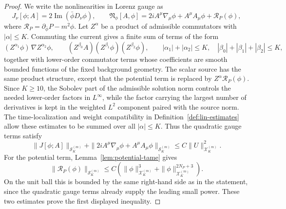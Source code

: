 \documentclass[11pt]{article}
\numberwithin{equation}{section}
\theoremstyle{plain}
\theoremstyle{definition}
\theoremstyle{remark}
\begin{document}
\begin{proof}
We write the nonlinearities in Lorenz gauge as
\begin{equation}
 J_\nu[\phi;A]=2\operatorname{Im}(\bar\phi D_\nu\phi),
 \qquad
 \mathfrak N_\phi[A,\phi]=2iA^\mu\nabla_\mu\phi+A^\mu A_\mu\phi+\mathcal R_P(\phi),
\end{equation}
where \(\mathcal R_P=\partial_{\bar\phi}P-m^2\phi\).  Let \(Z^\alpha\) be a product of admissible commutators with \(|\alpha|\le K\).  Commuting the current gives a finite sum of terms of the form
\begin{equation}
 (Z^{\alpha_1}\phi)\,\nabla Z^{\alpha_2}\phi,
 \qquad
 (Z^{\beta_0}A)(Z^{\beta_1}\phi)(Z^{\beta_2}\phi),
 \qquad
 |\alpha_1|+|\alpha_2|\le K,
 \quad |\beta_0|+|\beta_1|+|\beta_2|\le K,
\end{equation}
together with lower-order commutator terms whose coefficients are smooth bounded functions of the fixed background geometry.  The scalar source has the same product structure, except that the potential term is replaced by \(Z^\alpha\mathcal R_P(\phi)\).  Since \(K\ge10\), the Sobolev part of the admissible solution norm controls the needed lower-order factors in \(L^\infty\), while the factor carrying the largest number of derivatives is kept in the weighted \(L^2\) component paired with the source norm.  The time-localization and weight compatibility in Definition~\ref{def:lin-estimates} allow these estimates to be summed over all \(|\alpha|\le K\).  Thus the quadratic gauge terms satisfy
\begin{equation}
 \|J[\phi;A]\|_{\mathcal S_K^{(m)}}+
 \|2iA^\mu\nabla_\mu\phi+A^\mu A_\mu\phi\|_{\mathcal S_K^{(m)}}
 \le C\|U\|_{\mathcal X_K^{(m)}}^2.
\end{equation}
For the potential term, Lemma~\ref{lem:potential-tame} gives
\begin{equation}\label{eq:potential-source-cubic-corrected}
 \|\mathcal R_P(\phi)\|_{\mathcal S_K^{(m)}}
 \le C\left(\|\phi\|_{\mathcal X_K^{(m)}}^{3}+\|\phi\|_{\mathcal X_K^{(m)}}^{2N_P+3}\right).
\end{equation}
On the unit ball this is bounded by the same right-hand side as in the statement, since the quadratic gauge terms already supply the leading small power.  These two estimates prove the first displayed inequality.


\end{proof}
\end{document}
